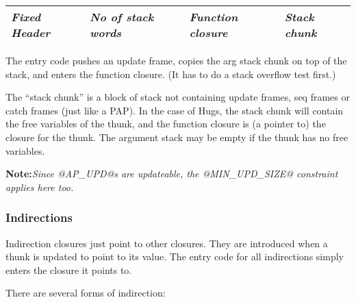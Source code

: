 \documentclass[11pt]{article}
\newcommand{\note}[1]{{{\bf Note:}\sl #1}}
\newcommand{\Subsubsection}[2]{\subsubsection{#1}\label{sec:#2}}
\begin{document}
\begin{center}
\begin{tabular}{|l|l|l|l|}
\hline
\emph{Fixed Header} & \emph{No of stack words} & \emph{Function closure} & \emph{Stack chunk} \\
\hline
\end{tabular}
\end{center}

The entry code pushes an update frame, copies the arg stack chunk on
top of the stack, and enters the function closure.  (It has to do a
stack overflow test first.)

The ``stack chunk'' is a block of stack not containing update frames,
seq frames or catch frames (just like a PAP).  In the case of Hugs,
the stack chunk will contain the free variables of the thunk, and the
function closure is (a pointer to) the closure for the thunk.  The
argument stack may be empty if the thunk has no free variables.

\note{Since @AP\_UPD@s are updateable, the @MIN\_UPD\_SIZE@ constraint applies here too.}

\Subsubsection{Indirections}{IND}

Indirection closures just point to other closures. They are introduced
when a thunk is updated to point to its value.  The entry code for all
indirections simply enters the closure it points to.

There are several forms of indirection:
\end{document}
